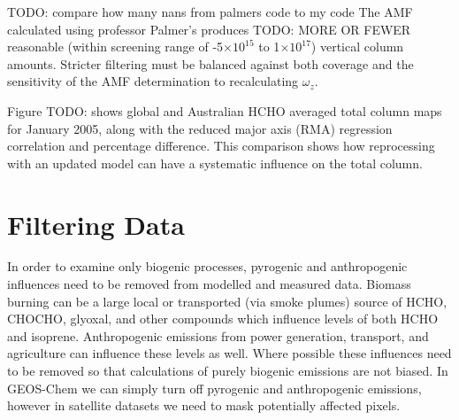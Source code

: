     
    TODO: compare how many nans from palmers code to my code
    The AMF calculated using professor Palmer's produces TODO: MORE OR FEWER reasonable (within screening range of -5$\times 10^{15}$ to 1$\times 10^{17}$) vertical column amounts.
    Stricter filtering must be balanced against both coverage and the sensitivity of the AMF determination to recalculating $\omega_z$.
  
    Figure TODO: shows global and Australian HCHO averaged total column maps for January 2005, along with the reduced major axis (RMA) regression correlation and percentage difference.
    This comparison shows how reprocessing with an updated model can have a systematic influence on the total column.
    
\section{Filtering Data}
  \label{Model:Filter}
  
  In order to examine only biogenic processes, pyrogenic and anthropogenic influences need to be removed from modelled and measured data.
  Biomass burning can be a large local or transported (via smoke plumes) source of HCHO, CHOCHO, glyoxal, and other compounds which influence levels of both HCHO and isoprene.
  Anthropogenic emissions from power generation, transport, and agriculture can influence these levels as well.
  Where possible these influences need to be removed so that calculations of purely biogenic emissions are not biased. 
  In GEOS-Chem we can simply turn off pyrogenic and anthropogenic emissions, however in satellite datasets we need to mask potentially affected pixels.
  
